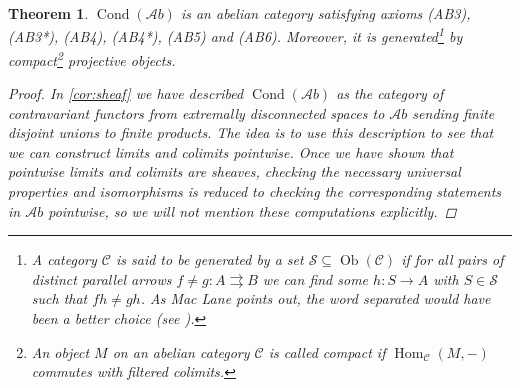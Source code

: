 \documentclass[11pt,A4]{article}
\theoremstyle{plain}
\newtheorem{thm}{Theorem}[section]
\theoremstyle{definition}
\theoremstyle{remark}
\newcommand{\1}{\mathbbm{1}}
\newcommand{\C}{\mathscr{C}}
\newcommand{\Ab}{\mathscr{A}b}
\DeclareMathOperator{\Hom}{Hom}
\DeclareMathOperator{\Cond}{Cond}
\DeclareMathOperator{\Ob}{Ob}
\begin{document}
\begin{thm}
    $\Cond(\Ab)$ is an abelian category satisfying axioms (AB3), (AB3*), (AB4), (AB4*), (AB5) and (AB6).
    Moreover, it is generated\footnote{A category $\C$ is said to be \textit{generated} by a set $\mathscr{S}\subseteq \Ob(\C)$ if for all pairs of distinct parallel arrows $f\neq g\colon A\rightrightarrows B$ we can find some $h\colon S\to A$ with $S\in \mathscr{S}$ such that $fh\neq gh$.
    As Mac Lane points out, the word \textit{separated} would have been a better choice (see \cite[Section V.7]{mac78}).} by compact\footnote{An object $M$ on an abelian category $\C$ is called \textit{compact} if $\Hom_{\C}(M,-)$ commutes with filtered colimits.} projective objects.
    \begin{proof}
	In \cref{cor:sheaf} we have described $\Cond(\Ab)$ as the category of contravariant functors from extremally disconnected spaces to $\Ab$ sending finite disjoint unions to finite products.
	The idea is to use this description to see that we can construct limits and colimits pointwise.
	Once we have shown that pointwise limits and colimits are sheaves, checking the necessary universal properties and isomorphisms is reduced to checking the corresponding statements in $\Ab$ pointwise, so we will not mention these computations explicitly.
	

\end{proof}
\end{thm}
\end{document}
